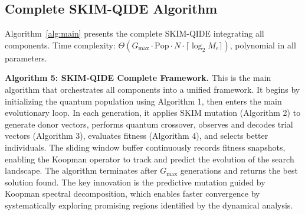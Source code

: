 \documentclass[10pt,twocolumn]{article}
\begin{document}
\subsection{Complete SKIM-QIDE Algorithm}
Algorithm~\ref{alg:main} presents the complete SKIM-QIDE integrating all components. Time complexity: $\Theta(G_{\max}\cdot\mathrm{Pop}\cdot N\cdot\lceil\log_2 M_e\rceil)$, polynomial in all parameters.

\textbf{Algorithm 5: SKIM-QIDE Complete Framework.}
This is the main algorithm that orchestrates all components into a unified framework. It begins by initializing the quantum population using Algorithm 1, then enters the main evolutionary loop. In each generation, it applies SKIM mutation (Algorithm 2) to generate donor vectors, performs quantum crossover, observes and decodes trial vectors (Algorithm 3), evaluates fitness (Algorithm 4), and selects better individuals. The sliding window buffer continuously records fitness snapshots, enabling the Koopman operator to track and predict the evolution of the search landscape. The algorithm terminates after $G_{\max}$ generations and returns the best solution found. The key innovation is the predictive mutation guided by Koopman spectral decomposition, which enables faster convergence by systematically exploring promising regions identified by the dynamical analysis.
\end{document}

